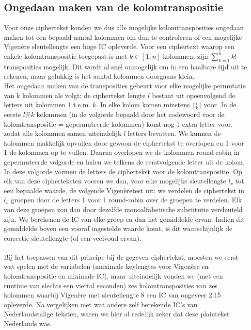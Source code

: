 \subsection{Ongedaan maken van de kolomtranspositie}
Voor onze ciphertekst konden we dus alle mogelijke kolomtransposities ongedaan maken tot een bepaald aantal kolommen om dan te controleren of een mogelijke Vigen\`ere sleutellengte een hoge IC opleverde. Voor een ciphertext waarop een enkele kolomtranspositie toegepast is met $k \in [1,n]$ kolommen, zijn $\sum_{k=1}^{n}k!$ transposities mogelijk. Dit wordt al snel onmogelijk om in een haalbare tijd uit te rekenen, maar gelukkig is het aantal kolommen doorgaans klein. \\
Het ongedaan maken van de transposities gebeurt voor elke mogelijke permutatie van k kolommen als volgt: de ciphertekst lengte $l$ bestaat uit opeenvolgend de letters uit kolommen 1 t.e.m. $k$. In elke kolom komen minstens $\lfloor\frac{l}{k}\rfloor$ voor. In de eerste $l\%k$ kolommen (in de volgorde bepaald door het codewoord voor de kolomtranspositie = gepermuteerde kolommen) komt nog 1 extra letter voor, zodat alle kolommen samen uiteindelijk $l$ letters bevatten. We kunnen de kolommen makkelijk opvullen door gewoon de ciphertekst te overlopen en 1 voor 1 de kolommen op te vullen. Daarna overlopen we de kolommen round-robin in gepermuteerde volgorde en halen we telkens de eerstvolgende letter uit de kolom. In deze volgorde vormen de letters de ciphertekst voor de kolomtranspositie. Op elk van deze cipherteksten voeren we dan, voor elke mogelijke sleutellengte $l_v$ tot een bepaalde waarde, de volgende Vigen\`eretest uit: we verdelen de ciphertekst in $l_v$ groepen door de letters 1 voor 1 round-robin over de groepen te verdelen. Elk van deze groepen zou dan door dezelfde monoalfabetische substitutie versleuteld zijn. We berekenen de IC van elke groep en dan het gemiddelde ervan. Indien dit gemiddelde boven een vooraf ingestelde waarde komt, is dit waarschijnlijk de correctie sleutellengte (of een veelvoud ervan). \\ \\ Bij het toepassen van dit principe bij de gegeven ciphertekst, moesten we eerst wat spelen met de variabelen (maximale keylengtes voor Vigen\`ere en kolomtranspositie en minimale IC), maar uiteindelijk vonden we (met een runtime van slechts een viertal seconden) zes kolomtransposities van zes kolommen waarbij Vigen\`ere met sleutellengte 8 een IC van ongeveer 2.15 opleverde. Na vergelijken met wat andere zelf berekende IC's van Nederlandstalige teksten, waren we hier al redelijk zeker dat deze plaintekst Nederlands was. 

